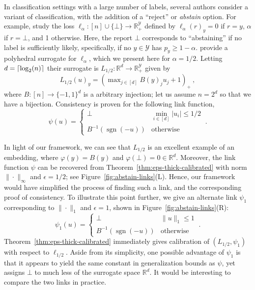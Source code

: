 \documentclass[11pt]{article}
\newcommand{\reals}{\mathbb{R}}
\newcommand{\Y}{\mathcal{Y}}
\DeclarePairedDelimiter\ceil{\lceil}{\rceil}
\newcommand{\ellabs}[1]{\ell_{#1}}
\DeclareMathOperator*{\sgn}{sgn}
\begin{document}
In classification settings with a large number of labels, several authors consider a variant of classification, with the addition of a ``reject'' or \emph{abstain} option.
For example, \citet{ramaswamy2018consistent} study the loss $\ellabs{\alpha} : [n] \cup \{\bot\} \to \reals^\Y_+$ defined by $\ellabs{\alpha}(r)_y = 0$ if $r=y$, $\alpha$ if $r = \bot$, and 1 otherwise.
Here, the report $\bot$ corresponds to ``abstaining'' if no label is sufficiently likely, specifically, if no $y\in\Y$ has $p_y \geq 1-\alpha$.
\citet{ramaswamy2018consistent} provide a polyhedral surrogate for $\ellabs{\alpha}$, which we present here for $\alpha=1/2$.
Letting $d = \ceil{\log_2(n)}$ their surrogate is $L_{1/2} : \reals^d \to \reals^\Y_+$ given by
\begin{equation}\label{eq:abstain-surrogate}
L_{1/2}(u)_y = \left(\max\nolimits_{j \in [d]}B(y)_j u_j + 1\right)_+~,
\end{equation}
where $B:[n]\to\{-1,1\}^d$ is a arbitrary injection; let us assume $n = 2^d$ so that we have a bijection.
Consistency is proven for the following link function,
\begin{equation}\label{eq:abstain-link}
  \psi(u) = \begin{cases}
	\bot & \min_{i \in [d]} |u_i| \leq 1/2\\
	B^{-1}(\sgn(-u)) &\text{otherwise}
  \end{cases}~.
\end{equation}

In light of our framework, we can see that $L_{1/2}$ is an excellent example of an embedding, where $\varphi(y) = B(y)$ and $\varphi(\bot) = 0 \in \reals^d$.
Moreover, the link function $\psi$ can be recovered from Theorem~\ref{thm:eps-thick-calibrated} with norm $\|\cdot\|_\infty$ and $\epsilon=1/2$; see Figure~\ref{fig:abstain-links}(L).
Hence, our framework would have simplified the process of finding such a link, and the corresponding proof of consistency.
To illustrate this point further, we give an alternate link $\psi_1$ corresponding to $\|\cdot\|_1$ and $\epsilon=1$, shown in Figure~\ref{fig:abstain-links}(R):
\begin{equation}\label{eq:abstain-link-1}
  \psi_1(u) = \begin{cases}
	\bot & \|u\|_1 \leq 1\\
	B^{-1}(\sgn(-u)) &\text{otherwise}
  \end{cases}~.
\end{equation}
Theorem~\ref{thm:eps-thick-calibrated} immediately gives calibration of $(L_{1/2},\psi_1)$ with respect to $\ellabs{1/2}$.
Aside from its simplicity, one possible advantage of $\psi_1$ is that it appears to yield the same constant in generalization bounds as $\psi$, yet assigns $\bot$ to much less of the surrogate space $\reals^d$.
It would be interesting to compare the two links in practice.
\end{document}
